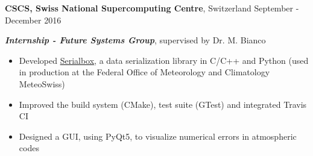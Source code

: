 \textbf{CSCS, Swiss National Supercomputing Centre}, Switzerland \hfill September - December 2016

\textbf{\textit{Internship - Future Systems Group}}, supervised by Dr. M. Bianco

\begin{itemize}
    \item Developed \href{https://github.com/eth-cscs/serialbox2}{Serialbox}, a data serialization library in C/C++ and Python (used in production at the Federal Office of Meteorology and Climatology MeteoSwiss)
	\item Improved the build system (CMake), test suite (GTest) and integrated Travis CI
    \item Designed a GUI, using PyQt5, to visualize numerical errors in atmospheric codes
\end{itemize}
